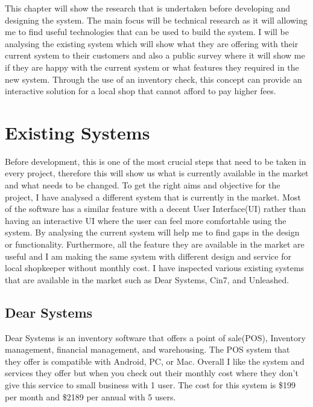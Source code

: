 This chapter will show the research that is undertaken before developing and designing the system. The main focus will be technical research as it will allowing me to find useful technologies that can be used to build the system. I will be analysing the existing system which will show what they are offering with their current system to their customers and also a public survey where it will show me if they are happy with the current system or what features they required in the new system. Through the use of an inventory check, this concept can provide an interactive solution for a local shop that cannot afford to pay higher fees.

\section{Existing Systems}
Before development, this is one of the most crucial steps that need to be taken in every project, therefore this will show us what is currently available in the market and what needs to be changed. To get the right aims and objective for the project, I have analysed a different system that is currently in the market. Most of the software has a similar feature with a decent User Interface(UI) rather than having an interactive UI where the user can feel more comfortable using the system. By analysing the current system will help me to find gaps in the design or functionality. Furthermore, all the feature they are available in the market are useful and I am making the same system with different design and service for local shopkeeper without monthly cost.\newline
\newline I have inspected various existing systems that are available in the market such as Dear Systems, Cin7, and Unleashed.

\subsection{Dear Systems}
Dear Systems is an inventory software that offers a point of sale(POS), Inventory management, financial management, and warehousing. The POS system that they offer is compatible with Android, PC, or Mac. Overall I like the system and services they offer but when you check out their monthly cost where they don't give this service to small business with 1 user. The cost for this system is \$199 per month and \$2189 per annual with 5 users.   

